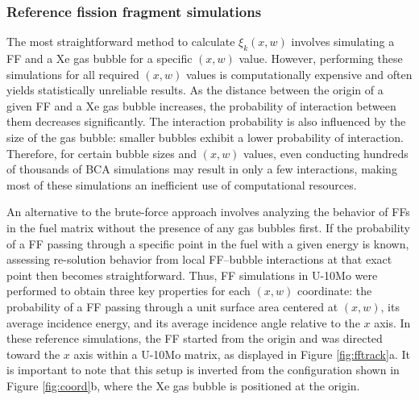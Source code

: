 \documentclass[review]{elsarticle}
\begin{document}
\subsubsection{Reference fission fragment simulations}

The most straightforward method to calculate $\xi_k(x, w)$ involves simulating a FF and a Xe gas bubble for a specific $(x, w)$ value. However, performing these simulations for all required $(x, w)$ values is computationally expensive and often yields statistically unreliable results. As the distance between the origin of a given FF and a Xe gas bubble increases, the probability of interaction between them decreases significantly. The interaction probability is also influenced by the size of the gas bubble: smaller bubbles exhibit a lower probability of interaction. Therefore, for certain bubble sizes and $(x, w)$ values, even conducting hundreds of thousands of BCA simulations may result in only a few interactions, making most of these simulations an inefficient use of computational resources.

An alternative to the brute-force approach involves analyzing the behavior of FFs in the fuel matrix without the presence of any gas bubbles first. If the probability of a FF passing through a specific point in the fuel with a given energy is known, assessing re-solution behavior from local FF--bubble interactions at that exact point then becomes straightforward. Thus, FF simulations in U-10Mo were performed to obtain three key properties for each $(x, w)$ coordinate: the probability of a FF passing through a unit surface area centered at $(x, w)$, its average incidence energy, and its average incidence angle relative to the $x$ axis. In these reference simulations, the FF started from the origin and was directed toward the $x$ axis within a U-10Mo matrix, as displayed in Figure \ref{fig:fftrack}a. It is important to note that this setup is inverted from the configuration shown in Figure \ref{fig:coord}b, where the Xe gas bubble is positioned at the origin.
\end{document}
